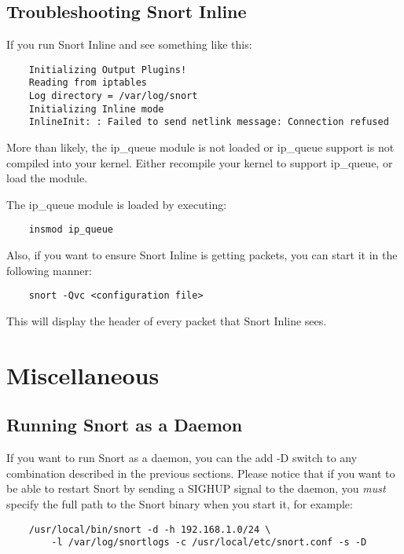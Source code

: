 \documentclass[english]{report}
\begin{document}
\subsection{Troubleshooting Snort Inline}

If you run Snort Inline and see something like this:

\begin{verbatim}
    Initializing Output Plugins!
    Reading from iptables
    Log directory = /var/log/snort
    Initializing Inline mode
    InlineInit: : Failed to send netlink message: Connection refused
\end{verbatim}

More than likely, the ip\_queue module is not loaded or ip\_queue support is
not compiled into your kernel.  Either recompile your kernel to support
ip\_queue, or load the module.

The ip\_queue module is loaded by executing:

\begin{verbatim}
    insmod ip_queue
\end{verbatim}

Also, if you want to ensure Snort Inline is getting packets, you can start it
in the following manner:

\begin{verbatim}
    snort -Qvc <configuration file>
\end{verbatim}

This will display the header of every packet that Snort Inline sees. 

\section{Miscellaneous}

\subsection{Running Snort as a Daemon}

If you want to run Snort as a daemon, you can the add -D switch to any
combination described in the previous sections. Please notice that if you want
to be able to restart Snort by sending a SIGHUP signal to the daemon, you {\em
must} specify the full path to the Snort binary when you start it, for example:

\begin{verbatim}
    /usr/local/bin/snort -d -h 192.168.1.0/24 \
        -l /var/log/snortlogs -c /usr/local/etc/snort.conf -s -D
\end{verbatim}
\end{document}
